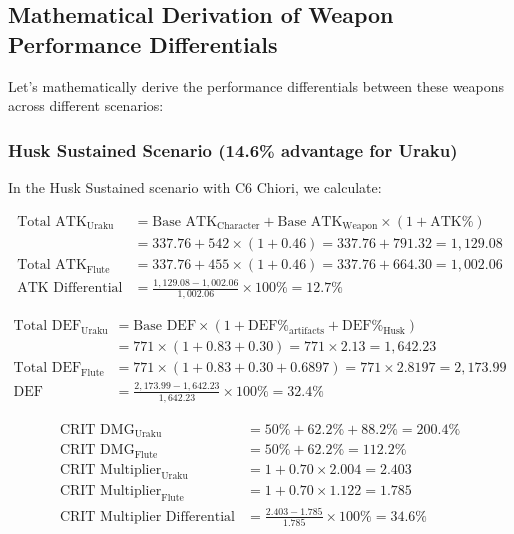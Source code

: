 \documentclass[12pt,a4paper]{article}
\begin{document}
\subsection{Mathematical Derivation of Weapon Performance Differentials}

Let's mathematically derive the performance differentials between these weapons across different scenarios:

\subsubsection{Husk Sustained Scenario (14.6\% advantage for Uraku)}

In the Husk Sustained scenario with C6 Chiori, we calculate:

\begin{align}
\text{Total ATK}_{\text{Uraku}} &= \text{Base ATK}_{\text{Character}} + \text{Base ATK}_{\text{Weapon}} \times (1 + \text{ATK\%}) \\
&= 337.76 + 542 \times (1 + 0.46) = 337.76 + 791.32 = 1,129.08 \\
\text{Total ATK}_{\text{Flute}} &= 337.76 + 455 \times (1 + 0.46) = 337.76 + 664.30 = 1,002.06 \\
\text{ATK Differential} &= \frac{1,129.08 - 1,002.06}{1,002.06} \times 100\% = 12.7\%
\end{align}

\begin{align}
\text{Total DEF}_{\text{Uraku}} &= \text{Base DEF} \times (1 + \text{DEF\%}_{\text{artifacts}} + \text{DEF\%}_{\text{Husk}}) \\
&= 771 \times (1 + 0.83 + 0.30) = 771 \times 2.13 = 1,642.23 \\
\text{Total DEF}_{\text{Flute}} &= 771 \times (1 + 0.83 + 0.30 + 0.6897) = 771 \times 2.8197 = 2,173.99 \\
\text{DEF Differential} &= \frac{2,173.99 - 1,642.23}{1,642.23} \times 100\% = 32.4\%
\end{align}

\begin{align}
\text{CRIT DMG}_{\text{Uraku}} &= 50\% + 62.2\% + 88.2\% = 200.4\% \\
\text{CRIT DMG}_{\text{Flute}} &= 50\% + 62.2\% = 112.2\% \\
\text{CRIT Multiplier}_{\text{Uraku}} &= 1 + 0.70 \times 2.004 = 2.403 \\
\text{CRIT Multiplier}_{\text{Flute}} &= 1 + 0.70 \times 1.122 = 1.785 \\
\text{CRIT Multiplier Differential} &= \frac{2.403 - 1.785}{1.785} \times 100\% = 34.6\%
\end{align}
\end{document}
